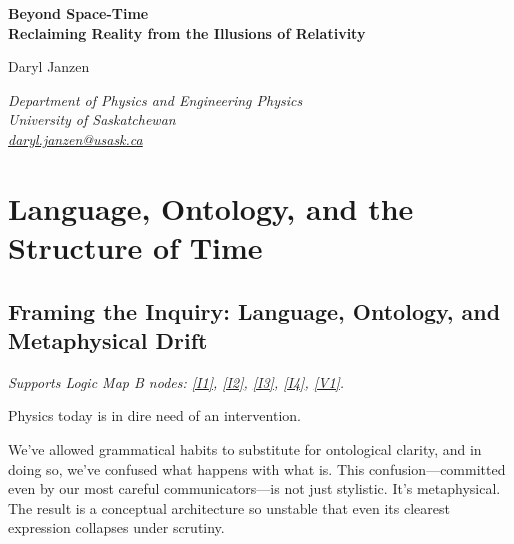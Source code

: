 \documentclass[12pt]{book}
\begin{document}

\begin{titlepage}
  \centering
  \vspace*{2cm}
  {\Huge\bfseries Beyond Space-Time\\[0.5em]
  \Large Reclaiming Reality from the Illusions of Relativity\par}

  \vspace{2.5cm}
  {\Large Daryl Janzen\par}

  \vspace{0.8cm}
  \textit{Department of Physics and Engineering Physics\\
  University of Saskatchewan\\
  \href{mailto:daryl.janzen@usask.ca}{daryl.janzen@usask.ca}}

\end{titlepage}

\frontmatter
{}
\tableofcontents

\mainmatter
{}

\chapter{Language, Ontology, and the Structure of Time}

\section[Framing the Inquiry]{Framing the Inquiry: Language, Ontology, and Metaphysical Drift}\label{sec:1.1}
\noindent\textit{Supports Logic Map B nodes: \hyperref[appendix:I1]{[I1]}, \hyperref[appendix:I2]{[I2]}, \hyperref[appendix:I3]{[I3]}, \hyperref[appendix:I4]{[I4]}, \hyperref[appendix:V1]{[V1]}.}

\vspace{4pt}

Physics today is in dire need of an intervention.

We've allowed grammatical habits to substitute for ontological clarity, and in doing so, we've confused what happens with what is. This confusion---committed even by our most careful communicators---is not just stylistic. It's metaphysical. The result is a conceptual architecture so unstable that even its clearest expression collapses under scrutiny.
\end{document}
